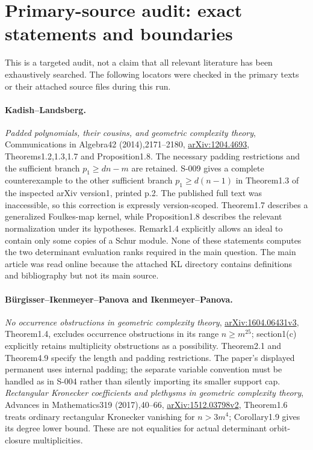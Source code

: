 \section{Primary-source audit: exact statements and boundaries}
This is a targeted audit, not a claim that all relevant literature has
been exhaustively searched. The following locators were checked in the
primary texts or their attached source files during this run.

\paragraph{Kadish--Landsberg.}
\emph{Padded polynomials, their cousins, and geometric complexity
theory}, Communications in Algebra42 (2014),2171--2180,
\href{https://arxiv.org/abs/1204.4693}{arXiv:1204.4693},
Theorems1.2,1.3,1.7 and Proposition1.8.
The necessary padding restrictions and the sufficient branch
$p_1\ge dn-m$ are retained. S-009 gives a complete counterexample
to the other sufficient branch $p_1\ge d(n-1)$ in Theorem1.3 of
the inspected arXiv version1, printed p.2. The published full text
was inaccessible, so this correction is expressly version-scoped.
Theorem1.7 describes a generalized Foulkes-map kernel, while
Proposition1.8 describes the relevant normalization under its hypotheses.
Remark1.4 explicitly allows an ideal to contain only some copies of a
Schur module. None of these statements computes the two determinant
evaluation ranks required in the main question. The main article was
read online because the attached KL directory contains definitions and
bibliography but not its main source.

\paragraph{B\"urgisser--Ikenmeyer--Panova and Ikenmeyer--Panova.}
\emph{No occurrence obstructions in geometric complexity theory},
\href{https://arxiv.org/abs/1604.06431}{arXiv:1604.06431v3},
Theorem1.4, excludes occurrence obstructions in its range $n\ge m^{25}$;
section1(c) explicitly retains multiplicity obstructions as a possibility.
Theorem2.1 and Theorem4.9 specify the length and padding restrictions.
The paper's displayed permanent uses internal padding; the separate
variable convention must be handled as in S-004 rather than silently
importing its smaller support cap.
\emph{Rectangular Kronecker coefficients and plethysms in geometric
complexity theory}, Advances in Mathematics319 (2017),40--66,
\href{https://arxiv.org/abs/1512.03798}{arXiv:1512.03798v2},
Theorem1.6 treats ordinary rectangular Kronecker vanishing for
$n>3m^4$; Corollary1.9 gives its degree lower bound. These are not
equalities for actual determinant orbit-closure multiplicities.

